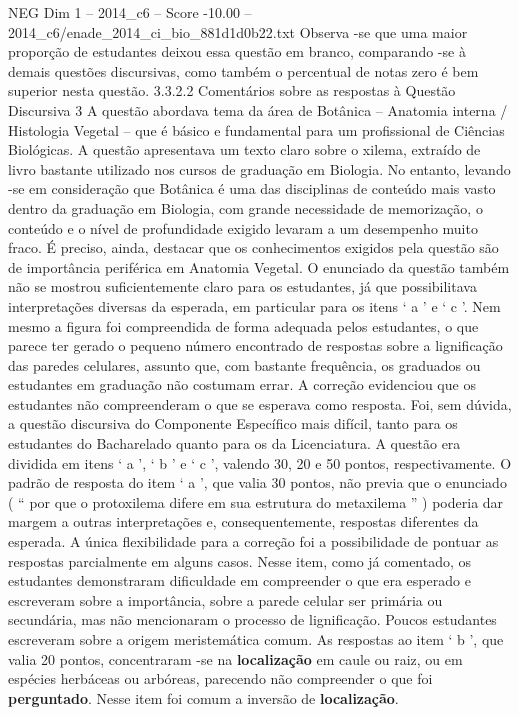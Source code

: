 \begin{textsample}{NEG Dim 1 – 2014\_c6 – Score -10.00 – 2014\_c6/enade\_2014\_ci\_bio\_881d1d0b22.txt}
Observa -se que uma maior proporção de estudantes deixou essa questão em branco, comparando -se à demais questões discursivas, como também o percentual de notas zero é bem superior nesta questão. 3.3.2.2 Comentários sobre as respostas à Questão Discursiva 3 A questão abordava tema da área de Botânica – Anatomia interna / Histologia Vegetal – que é básico e fundamental para um profissional de Ciências Biológicas.
A questão apresentava um texto claro sobre o xilema, extraído de livro bastante utilizado nos cursos de graduação em Biologia.
No entanto, levando -se em consideração que Botânica é uma das disciplinas de conteúdo mais vasto dentro da graduação em Biologia, com grande necessidade de memorização, o conteúdo e o nível de profundidade exigido levaram a um desempenho muito fraco.
É preciso, ainda, destacar que os conhecimentos exigidos pela questão são de importância periférica em Anatomia Vegetal.
O enunciado da questão também não se mostrou suficientemente claro para os estudantes, já que possibilitava interpretações diversas da esperada, em particular para os itens ‘ a ’ e ‘ c ’.
Nem mesmo a figura foi compreendida de forma adequada pelos estudantes, o que parece ter gerado o pequeno número encontrado de respostas sobre a lignificação das paredes celulares, assunto que, com bastante frequência, os graduados ou estudantes em graduação não costumam errar.
A correção evidenciou que os estudantes não compreenderam o que se esperava como resposta.
Foi, sem dúvida, a questão discursiva do Componente Específico mais difícil, tanto para os estudantes do Bacharelado quanto para os da Licenciatura.
A questão era dividida em itens ‘ a ’, ‘ b ’ e ‘ c ’, valendo 30, 20 e 50 pontos, respectivamente.
O padrão de resposta do item ‘ a ’, que valia 30 pontos, não previa que o enunciado ( “ por que o protoxilema difere em sua estrutura do metaxilema ” ) poderia dar margem a outras interpretações e, consequentemente, respostas diferentes da esperada.
A única flexibilidade para a correção foi a possibilidade de pontuar as respostas parcialmente em alguns casos.
Nesse item, como já comentado, os estudantes demonstraram dificuldade em compreender o que era esperado e escreveram sobre a importância, sobre a parede celular ser primária ou secundária, mas não mencionaram o processo de lignificação.
Poucos estudantes escreveram sobre a origem meristemática comum.
As respostas ao item ‘ b ’, que valia 20 pontos, concentraram -se na \textbf{localização} em caule ou raiz, ou em espécies herbáceas ou arbóreas, parecendo não compreender o que foi \textbf{perguntado}.
Nesse item foi comum a inversão de \textbf{localização}.

\end{textsample}
